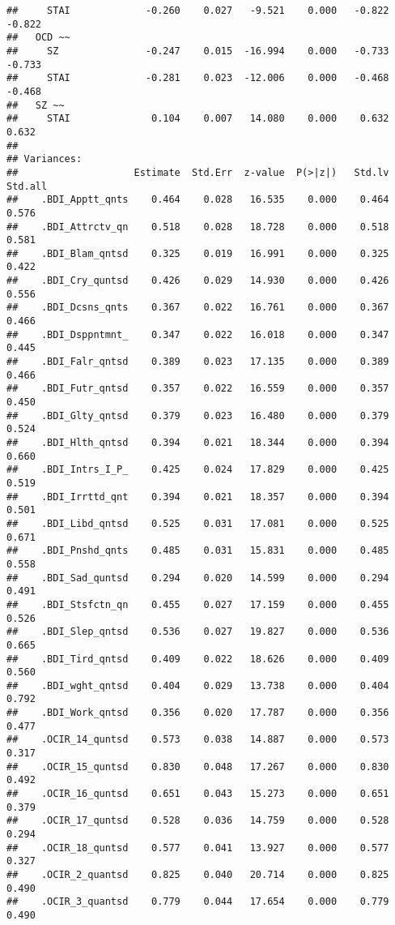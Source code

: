 \documentclass[]{article}
\begin{document}
\begin{verbatim}
##     STAI             -0.260    0.027   -9.521    0.000   -0.822   -0.822
##   OCD ~~                                                                
##     SZ               -0.247    0.015  -16.994    0.000   -0.733   -0.733
##     STAI             -0.281    0.023  -12.006    0.000   -0.468   -0.468
##   SZ ~~                                                                 
##     STAI              0.104    0.007   14.080    0.000    0.632    0.632
## 
## Variances:
##                    Estimate  Std.Err  z-value  P(>|z|)   Std.lv  Std.all
##    .BDI_Apptt_qnts    0.464    0.028   16.535    0.000    0.464    0.576
##    .BDI_Attrctv_qn    0.518    0.028   18.728    0.000    0.518    0.581
##    .BDI_Blam_qntsd    0.325    0.019   16.991    0.000    0.325    0.422
##    .BDI_Cry_quntsd    0.426    0.029   14.930    0.000    0.426    0.556
##    .BDI_Dcsns_qnts    0.367    0.022   16.761    0.000    0.367    0.466
##    .BDI_Dsppntmnt_    0.347    0.022   16.018    0.000    0.347    0.445
##    .BDI_Falr_qntsd    0.389    0.023   17.135    0.000    0.389    0.466
##    .BDI_Futr_qntsd    0.357    0.022   16.559    0.000    0.357    0.450
##    .BDI_Glty_qntsd    0.379    0.023   16.480    0.000    0.379    0.524
##    .BDI_Hlth_qntsd    0.394    0.021   18.344    0.000    0.394    0.660
##    .BDI_Intrs_I_P_    0.425    0.024   17.829    0.000    0.425    0.519
##    .BDI_Irrttd_qnt    0.394    0.021   18.357    0.000    0.394    0.501
##    .BDI_Libd_qntsd    0.525    0.031   17.081    0.000    0.525    0.671
##    .BDI_Pnshd_qnts    0.485    0.031   15.831    0.000    0.485    0.558
##    .BDI_Sad_quntsd    0.294    0.020   14.599    0.000    0.294    0.491
##    .BDI_Stsfctn_qn    0.455    0.027   17.159    0.000    0.455    0.526
##    .BDI_Slep_qntsd    0.536    0.027   19.827    0.000    0.536    0.665
##    .BDI_Tird_qntsd    0.409    0.022   18.626    0.000    0.409    0.560
##    .BDI_wght_qntsd    0.404    0.029   13.738    0.000    0.404    0.792
##    .BDI_Work_qntsd    0.356    0.020   17.787    0.000    0.356    0.477
##    .OCIR_14_quntsd    0.573    0.038   14.887    0.000    0.573    0.317
##    .OCIR_15_quntsd    0.830    0.048   17.267    0.000    0.830    0.492
##    .OCIR_16_quntsd    0.651    0.043   15.273    0.000    0.651    0.379
##    .OCIR_17_quntsd    0.528    0.036   14.759    0.000    0.528    0.294
##    .OCIR_18_quntsd    0.577    0.041   13.927    0.000    0.577    0.327
##    .OCIR_2_quantsd    0.825    0.040   20.714    0.000    0.825    0.490
##    .OCIR_3_quantsd    0.779    0.044   17.654    0.000    0.779    0.490

\end{verbatim}
\end{document}
